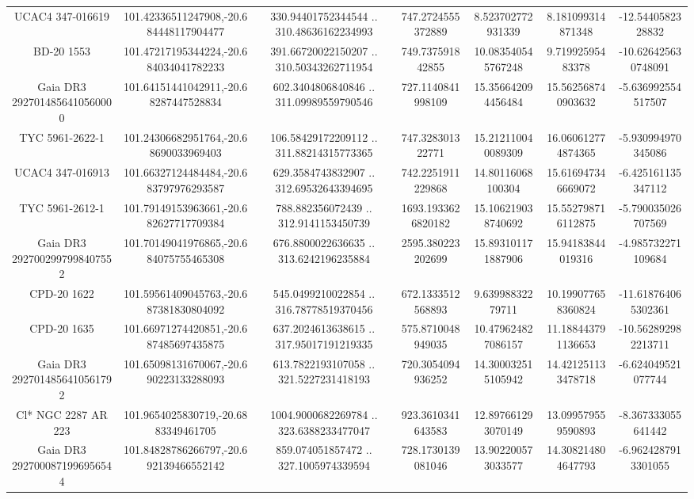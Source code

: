 \begin{table}
\begin{tabular}{ccccccc}
UCAC4 347-016619 & 101.42336511247908,-20.684448117904477 & 330.94401752344544 .. 310.48636162234993 & 747.2724555372889 & 8.523702772931339 & 8.181099314871348 & -12.5440582328832 \\
BD-20  1553 & 101.47217195344224,-20.684034041782233 & 391.66720022150207 .. 310.50343262711954 & 749.737591842855 & 10.083540545767248 & 9.71992595483378 & -10.626425630748091 \\
Gaia DR3 2927014856410560000 & 101.64151441042911,-20.68287447528834 & 602.3404806840846 .. 311.09989559790546 & 727.1140841998109 & 15.356642094456484 & 15.562568740903632 & -5.636992554517507 \\
TYC 5961-2622-1 & 101.24306682951764,-20.68690033969403 & 106.58429172209112 .. 311.88214315773365 & 747.328301322771 & 15.212110040089309 & 16.060612774874365 & -5.930994970345086 \\
UCAC4 347-016913 & 101.66327124484484,-20.683797976293587 & 629.3584743832907 .. 312.69532643394695 & 742.2251911229868 & 14.80116068100304 & 15.616947346669072 & -6.425161135347112 \\
TYC 5961-2612-1 & 101.79149153963661,-20.682627717709384 & 788.882356072439 .. 312.9141153450739 & 1693.1933626820182 & 15.106219038740692 & 15.552798716112875 & -5.790035026707569 \\
Gaia DR3 2927002997998407552 & 101.70149041976865,-20.684075755465308 & 676.8800022636635 .. 313.6242196235884 & 2595.380223202699 & 15.893101171887906 & 15.94183844019316 & -4.985732271109684 \\
CPD-20  1622 & 101.59561409045763,-20.687381830804092 & 545.0499210022854 .. 316.78778519370456 & 672.1333512568893 & 9.63998832279711 & 10.199077658360824 & -11.618764065302361 \\
CPD-20  1635 & 101.66971274420851,-20.687485697435875 & 637.2024613638615 .. 317.95017191219335 & 575.8710048949035 & 10.479624827086157 & 11.188443791136653 & -10.562892982213711 \\
Gaia DR3 2927014856410561792 & 101.65098131670067,-20.690223133288093 & 613.7822193107058 .. 321.5227231418193 & 720.3054094936252 & 14.300032515105942 & 14.421251133478718 & -6.624049521077744 \\
Cl* NGC 2287     AR     223 & 101.9654025830719,-20.6883349461705 & 1004.9000682269784 .. 323.6388233477047 & 923.3610341643583 & 12.897661293070149 & 13.099579559590893 & -8.367333055641442 \\
Gaia DR3 2927000871996956544 & 101.84828786266797,-20.692139466552142 & 859.074051857472 .. 327.1005974339594 & 728.1730139081046 & 13.902200573033577 & 14.308214804647793 & -6.9624287913301055 \\

\end{tabular}
\end{table}
